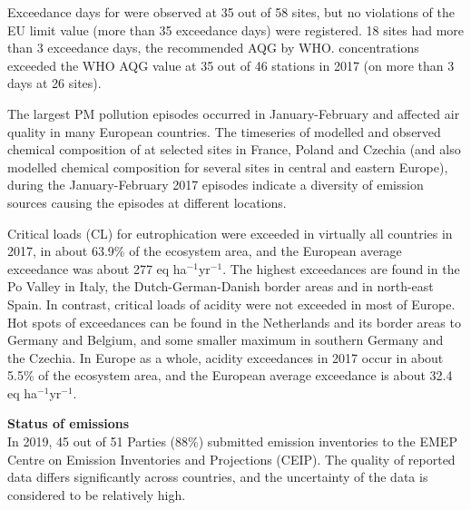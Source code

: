 Exceedance days for \PM[10] were observed at 35 out of 58
sites, but no violations of the \PM[10] EU limit value (more than 35
exceedance days) were registered. 18 sites had more than 3
exceedance days, the recommended AQG by WHO.
\PM[2.5] concentrations exceeded the WHO AQG value at 35 out of 46 stations in 2017 
(on more than 3 days at 26 sites).

The largest PM pollution episodes occurred in January-February 
and affected air quality in many European countries. The
timeseries of modelled and observed chemical composition of \PM[2.5]
at selected sites in France, Poland and Czechia (and also
modelled \PM[10] chemical composition for several sites in central and
eastern Europe), during the January-February 2017 episodes indicate
a diversity of emission sources causing the episodes at
different locations.

Critical loads (CL) for eutrophication were exceeded in virtually all countries in 2017, in about 63.9\% of the ecosystem area, and the European average exceedance was about 277 eq ha$^{-1}$yr$^{-1}$. The highest exceedances are found in the Po Valley in Italy, the Dutch-German-Danish border areas and in north-east Spain. In contrast, critical loads of acidity were not exceeded in most of Europe. Hot spots of exceedances can be found in the Netherlands and its border areas to Germany and Belgium, and some smaller maximum in southern Germany and the Czechia. In Europe as a whole, acidity exceedances in 2017 occur in about 5.5\% of the ecosystem area, and the European average exceedance is about 32.4 eq ha$^{-1}$yr$^{-1}$.\\

\newpage

\noindent
\textbf{Status of emissions}\\%
In 2019, 45 out of 51 Parties (88$\%$) submitted emission inventories to the EMEP Centre on Emission Inventories and Projections (CEIP). The quality of reported data differs significantly across countries, and the uncertainty of the data is considered to be relatively high.

